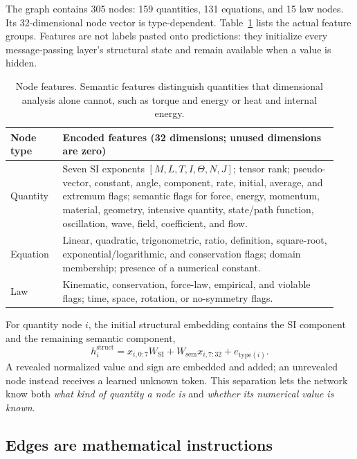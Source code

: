 \documentclass[10pt]{article}
\begin{document}
The graph contains 305 nodes: 159 quantities, 131 equations, and 15 law nodes. Its 32-dimensional node vector is type-dependent. Table~\ref{tab:nodefeatures} lists the actual feature groups. Features are not labels pasted onto predictions: they initialize every message-passing layer's structural state and remain available when a value is hidden.

\begin{table}[H]
\centering\small
\begin{tabular}{p{0.15\linewidth}p{0.79\linewidth}}
\toprule
Node type & Encoded features (32 dimensions; unused dimensions are zero)\\
\midrule
Quantity & Seven SI exponents $[M,L,T,I,\Theta,N,J]$; tensor rank; pseudo-vector, constant, angle, component, rate, initial, average, and extremum flags; semantic flags for force, energy, momentum, material, geometry, intensive quantity, state/path function, oscillation, wave, field, coefficient, and flow.\\
Equation & Linear, quadratic, trigonometric, ratio, definition, square-root, exponential/logarithmic, and conservation flags; domain membership; presence of a numerical constant.\\
Law & Kinematic, conservation, force-law, empirical, and violable flags; time, space, rotation, or no-symmetry flags.\\
\bottomrule
\end{tabular}
\caption{Node features. Semantic features distinguish quantities that dimensional analysis alone cannot, such as torque and energy or heat and internal energy.}
\label{tab:nodefeatures}
\end{table}

For quantity node $i$, the initial structural embedding contains the SI component and the remaining semantic component,
\begin{equation}
 h_i^{\mathrm{struct}}=x_{i,0:7}W_{\mathrm{SI}}
 +W_{\mathrm{sem}}x_{i,7:32}+e_{\mathrm{type}(i)}.
 \label{eq:nodeinit}
\end{equation}
A revealed normalized value and sign are embedded and added; an unrevealed node instead receives a learned unknown token. This separation lets the network know both \emph{what kind of quantity a node is} and \emph{whether its numerical value is known}.

\subsection{Edges are mathematical instructions}
\end{document}
